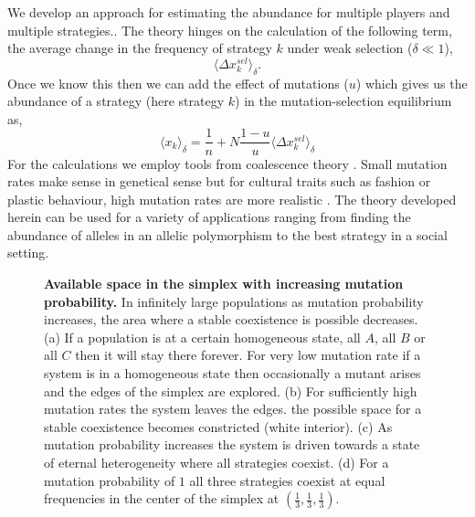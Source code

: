 \documentclass[oneside,11pt,a4paper]{book}
\begin{document}
We develop an approach for estimating the abundance for multiple players and multiple strategies..
The theory hinges on the calculation of the following term, the average change in the frequency of strategy $k$ under weak selection ($\delta \ll1$),
%
\begin{equation}
\langle \Delta x_k^{sel} \rangle_\delta. \nonumber
\end{equation}
%
Once we know this then we can add the effect of mutations ($u$) which gives us the abundance of a strategy (here strategy $k$) in the mutation-selection equilibrium \citep{antal:2009th,antal:2009aa,antal:2009hc} as,
%
\begin{equation}
\langle x_k \rangle_\delta = \frac{1}{n} + N \frac{1-u}{u} \langle \Delta x^{sel}_k \rangle_\delta
\end{equation}
%
For the calculations we employ tools from coalescence theory \citep{kingman:1982aa,kingman:1982bb,kingman:1982cc,kingman:2000fk,wakeley:2008aa}.
Small mutation rates make sense in genetical sense but for cultural traits such as fashion or plastic behaviour, high mutation rates are more realistic \citep{traulsen:2010pn,grujic:2010aa}.
The theory developed herein can be used for a variety of applications ranging from finding the abundance of alleles in an allelic polymorphism to the best strategy in a social setting.
%
\begin{figure}[!h]
  \begin{center}
    \leavevmode
    \caption{\textbf{Available space in the simplex with increasing mutation probability.}
    \small{In infinitely large populations as mutation probability increases, the area where a stable coexistence is possible decreases.
    (a) If a population is at a certain homogeneous state, all $A$, all $B$ or all $C$ then it will stay there forever.
For very low mutation rate if a system is in a homogeneous state then occasionally a mutant arises and the edges of the simplex are explored.
(b) For sufficiently high mutation rates the system leaves the edges. the possible space for a stable coexistence becomes constricted (white interior).
(c) As mutation probability increases the system is driven towards a state of eternal heterogeneity where all strategies coexist.
(d) For a mutation probability of $1$ all three strategies coexist at equal frequencies in the center of the simplex at $\left(\frac{1}{3},\frac{1}{3},\frac{1}{3}\right)$.
}}
    \label{mutsimplices}
  \end{center}
\end{figure}
%
\end{document}
